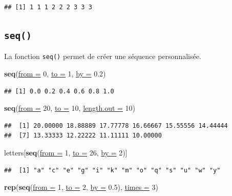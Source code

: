 \documentclass[twoside,symmetric]{book}
\newenvironment{Shaded}{}{}
\newcommand{\DataTypeTok}[1]{\underline{#1}}
\newcommand{\DecValTok}[1]{#1}
\newcommand{\FloatTok}[1]{#1}
\newcommand{\KeywordTok}[1]{\textbf{#1}}
\newcommand{\NormalTok}[1]{#1}
\begin{document}
\begin{verbatim}
## [1] 1 1 1 2 2 2 3 3 3
\end{verbatim}

\hypertarget{l015seq}{%
\subsection{\texorpdfstring{\texttt{seq()}}{seq()}}\label{l015seq}}

La fonction \texttt{seq()} permet de créer une séquence personnalisée.

\begin{Shaded}
\begin{Highlighting}[]
\KeywordTok{seq}\NormalTok{(}\DataTypeTok{from =} \DecValTok{0}\NormalTok{, }\DataTypeTok{to =} \DecValTok{1}\NormalTok{, }\DataTypeTok{by =} \FloatTok{0.2}\NormalTok{)}
\end{Highlighting}
\end{Shaded}

\begin{verbatim}
## [1] 0.0 0.2 0.4 0.6 0.8 1.0
\end{verbatim}

\begin{Shaded}
\begin{Highlighting}[]
\KeywordTok{seq}\NormalTok{(}\DataTypeTok{from =} \DecValTok{20}\NormalTok{, }\DataTypeTok{to =} \DecValTok{10}\NormalTok{, }\DataTypeTok{length.out =} \DecValTok{10}\NormalTok{)}
\end{Highlighting}
\end{Shaded}

\begin{verbatim}
##  [1] 20.00000 18.88889 17.77778 16.66667 15.55556 14.44444
##  [7] 13.33333 12.22222 11.11111 10.00000
\end{verbatim}

\begin{Shaded}
\begin{Highlighting}[]
\NormalTok{letters[}\KeywordTok{seq}\NormalTok{(}\DataTypeTok{from =} \DecValTok{1}\NormalTok{, }\DataTypeTok{to =} \DecValTok{26}\NormalTok{, }\DataTypeTok{by =} \DecValTok{2}\NormalTok{)]}
\end{Highlighting}
\end{Shaded}

\begin{verbatim}
##  [1] "a" "c" "e" "g" "i" "k" "m" "o" "q" "s" "u" "w" "y"
\end{verbatim}

\begin{Shaded}
\begin{Highlighting}[]
\KeywordTok{rep}\NormalTok{(}\KeywordTok{seq}\NormalTok{(}\DataTypeTok{from =} \DecValTok{1}\NormalTok{, }\DataTypeTok{to =} \DecValTok{2}\NormalTok{, }\DataTypeTok{by =} \FloatTok{0.5}\NormalTok{), }\DataTypeTok{times =} \DecValTok{3}\NormalTok{)}
\end{Highlighting}
\end{Shaded}
\end{document}
